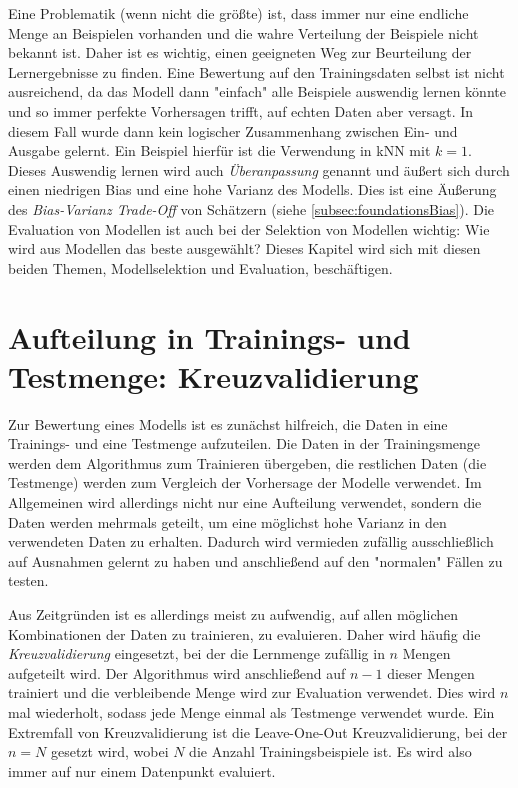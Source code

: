 	Eine Problematik (wenn nicht die größte) ist, dass immer nur eine endliche Menge an Beispielen vorhanden und die wahre Verteilung der Beispiele nicht bekannt ist. Daher ist es wichtig, einen geeigneten Weg zur Beurteilung der Lernergebnisse zu finden. Eine Bewertung auf den Trainingsdaten selbst ist nicht ausreichend, da das Modell dann "einfach" alle Beispiele auswendig lernen könnte und so immer perfekte Vorhersagen trifft, auf echten Daten aber versagt. In diesem Fall wurde dann kein logischer Zusammenhang zwischen Ein- und Ausgabe gelernt. Ein Beispiel hierfür ist die Verwendung in kNN mit \( k = 1 \). Dieses Auswendig lernen wird auch \emph{Überanpassung} genannt und äußert sich durch einen niedrigen Bias und eine hohe Varianz des Modells. Dies ist eine Äußerung des \emph{Bias-Varianz Trade-Off} von Schätzern (siehe \autoref{subsec:foundationsBias}). Die Evaluation von Modellen ist auch bei der Selektion von Modellen wichtig: Wie wird aus Modellen das beste ausgewählt? Dieses Kapitel wird sich mit diesen beiden Themen, Modellselektion und Evaluation, beschäftigen.

	\section{Aufteilung in Trainings- und Testmenge: Kreuzvalidierung}
		Zur Bewertung eines Modells ist es zunächst hilfreich, die Daten in eine Trainings- und eine Testmenge aufzuteilen. Die Daten in der Trainingsmenge werden dem Algorithmus zum Trainieren übergeben, die restlichen Daten (die Testmenge) werden zum Vergleich der Vorhersage der Modelle verwendet. Im Allgemeinen wird allerdings nicht nur eine Aufteilung verwendet, sondern die Daten werden mehrmals geteilt, um eine möglichst hohe Varianz in den verwendeten Daten zu erhalten. Dadurch wird vermieden zufällig ausschließlich auf Ausnahmen gelernt zu haben und anschließend auf den "normalen" Fällen zu testen.

		Aus Zeitgründen ist es allerdings meist zu aufwendig, auf allen möglichen Kombinationen der Daten zu trainieren, \bzw zu evaluieren. Daher wird häufig die \emph{Kreuzvalidierung} eingesetzt, bei der die Lernmenge zufällig in \(n\) Mengen aufgeteilt wird. Der Algorithmus wird anschließend auf \(n - 1\) dieser Mengen trainiert und die verbleibende Menge wird zur Evaluation verwendet. Dies wird \(n\) mal wiederholt, sodass jede Menge einmal als Testmenge verwendet wurde. Ein Extremfall von Kreuzvalidierung ist die Leave-One-Out Kreuzvalidierung, bei der \( n = N \) gesetzt wird, wobei \(N\) die Anzahl Trainingsbeispiele ist. Es wird also immer auf nur einem Datenpunkt evaluiert.

